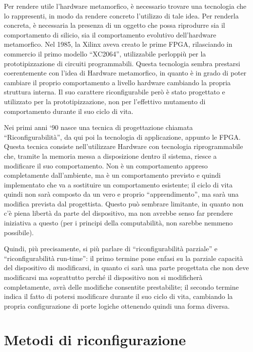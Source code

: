 \documentclass[a4paper,titlepage]{book}
\begin{document}
Per rendere utile l'hardware metamorfico, è necessario trovare una tecnologia che lo rappresenti, in modo da rendere concreto l'utilizzo di tale idea. Per renderla concreta, è necessaria la presenza di un oggetto che possa riprodurre sia il comportamento di silicio, sia il comportamento evolutivo dell'hardware metamorfico. Nel 1985, la Xilinx aveva creato le prime FPGA, rilasciando in commercio il primo modello ``XC2064'', utilizzabile perloppiù per la prototipizzazione di circuiti programmabili. Questa tecnologia sembra prestarsi coerentemente con l'idea di Hardware metamorfico, in quanto è in grado di poter cambiare il proprio comportamento a livello hardware cambiando la propria struttura interna. Il suo carattere riconfigurabile però è stato progettato e utilizzato per la prototipizzazione, non per l'effettivo mutamento di comportamento durante il suo ciclo di vita.

Nei primi anni `90 nasce una tecnica di progettazione chiamata ``Riconfigurabilità'', da qui poi la tecnologia di applicazione, appunto le FPGA. Questa tecnica consiste nell'utilizzare Hardware con tecnologia riprogrammabile che, tramite la memoria messa a disposizione dentro il sistema, riesce a modificare il suo comportamento. Non è un comportamento appreso completamente dall'ambiente, ma è un comportamento previsto e quindi implementato che va a sostituire un comportamento esistente; il ciclo di vita quindi non sarà composto da un vero e proprio ``apprendimento'', ma sarà una modifica prevista dal progettista. Questo può sembrare limitante, in quanto non c'è piena libertà da parte del dispositivo, ma non avrebbe senso far prendere iniziativa a questo (per i principi della computabilità, non sarebbe nemmeno possibile).

Quindi, più precisamente, si più parlare di ``riconfigurabilità parziale'' e ``riconfigurabilità run-time'': il primo termine pone enfasi su la parziale capacità del dispositivo di modificarsi, in quanto ci sarà una parte progettata che non deve modificarsi ma soprattutto perché il dispositivo non si modificherà completamente, avrà delle modifiche consentite prestabilite; il secondo termine indica il fatto di potersi modificare durante il suo ciclo di vita, cambiando la propria configurazione di porte logiche ottenendo quindi una forma diversa.

\section{Metodi di riconfigurazione}
\end{document}
